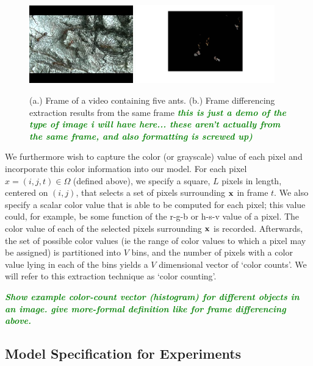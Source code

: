 \documentclass{article}
\newcommand{\willie}[1]{\textcolor{green}{\textsf{\emph{\textbf{\textcolor{green}{#1}}}}}}
\begin{document}
\begin{figure}
\centering
{\includegraphics[width=45mm]{antpic2.png}}
{\includegraphics[width=60mm]{frame_diff_ants_1.png}}
\caption{(a.) Frame of a video containing five ants. (b.) Frame differencing extraction results from the same frame \willie{this is just a demo of the type of image i will have here... these aren't actually from the same frame, and also formatting is screwed up)}}
\label{test}
\end{figure}

We furthermore wish to capture the color (or grayscale) value of each pixel and incorporate this color information into our model. For each pixel $x = (i, j, t) \in \Omega$ (defined above), we specify a square, $L$ pixels in length, centered on $(i, j)$, that selects a set of pixels surrounding $\bold{x}$ in frame $t$. We also specify a scalar color value that is able to be computed for each pixel; this value could, for example, be some function of the r-g-b or h-s-v value of a pixel. The color value of each of the selected pixels surrounding $\bold{x}$ is recorded. Afterwards, the set of possible color values (ie the range of color values to which a pixel may be assigned) is partitioned into $V$ bins, and the number of pixels with a color value lying in each of the bins yields a $V$ dimensional vector of `color counts'. We will refer to this extraction technique as `color counting'.

\willie{Show example color-count vector (histogram) for different objects in an image. give more-formal definition like for frame differencing above.}







\subsection{Model Specification for Experiments}
%
\end{document}
